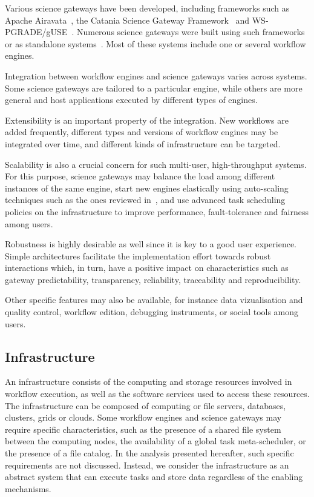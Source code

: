 \documentclass[preprint,3p,twocolumn]{elsarticle}
\begin{document}
Various science gateways have been developed, including frameworks
such as Apache Airavata~\cite{marru2011apache}, the Catania Science
Gateway Framework~\cite{ardizzone2012decide} and
WS-PGRADE/gUSE~\cite{Kacsuk2012}. Numerous science gateways were built
using such frameworks~\cite{kacsuk2014science,ardizzone2012decide} or
as standalone systems~\cite{SHER-14,GLAT-13}. Most of these systems
include one or several workflow engines.


Integration between workflow engines and science gateways varies
across systems. Some science gateways are tailored to a particular
engine, while others are more general and host applications
executed by different types of engines. %

Extensibility is an important property of the integration. New
workflows are added frequently, different types and versions of
workflow engines may be integrated over time, and different kinds of
infrastructure can be targeted. 

Scalability is also a crucial concern for such multi-user,
high-throughput systems. For this purpose, science gateways may
balance the load among different instances of the same engine, start
new engines elastically using auto-scaling techniques such as the ones
reviewed in~\cite{lorido2012auto}, and use advanced task scheduling
policies on the infrastructure to improve performance, fault-tolerance
and fairness among users.

Robustness is highly desirable as well since it is key to a
good user experience. Simple architectures facilitate the
implementation effort towards robust interactions which, in turn, have
a positive impact on characteristics such as gateway predictability,
transparency, reliability, traceability and
reproducibility. 

Other specific features may also be available, for instance
data vizualisation and quality control, workflow edition, debugging
instruments, or social tools among users. 

\subsection{Infrastructure}

An infrastructure consists of the computing and storage
resources involved in workflow execution, as well as the software
services used to access these resources. The infrastructure can be
composed of computing or file servers, databases, clusters, grids or
clouds. Some workflow engines and science gateways may require specific
characteristics, such as the presence of a shared file system between
the computing nodes, the availability of a global task meta-scheduler, or
the presence of a file catalog. In the analysis presented hereafter,
such specific requirements are not discussed. Instead, we consider the
infrastructure as an abstract system that can execute tasks and store
data regardless of the enabling mechanisms.
\end{document}
